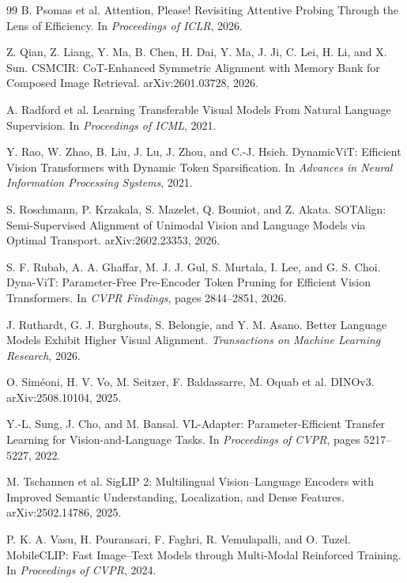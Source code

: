 \documentclass[11pt,a4paper]{article}
\begin{document}
\begin{thebibliography}{99}
B. Psomas et al.
\newblock Attention, Please! Revisiting Attentive Probing Through the Lens of
Efficiency.
\newblock In \emph{Proceedings of ICLR}, 2026.

Z. Qian, Z. Liang, Y. Ma, B. Chen, H. Dai, Y. Ma, J. Ji, C. Lei, H. Li, and
X. Sun.
\newblock CSMCIR: CoT-Enhanced Symmetric Alignment with Memory Bank for
Composed Image Retrieval.
\newblock arXiv:2601.03728, 2026.

A. Radford et al.
\newblock Learning Transferable Visual Models From Natural Language Supervision.
\newblock In \emph{Proceedings of ICML}, 2021.

Y. Rao, W. Zhao, B. Liu, J. Lu, J. Zhou, and C.-J. Hsieh.
\newblock DynamicViT: Efficient Vision Transformers with Dynamic Token
Sparsification.
\newblock In \emph{Advances in Neural Information Processing Systems}, 2021.

S. Roschmann, P. Krzakala, S. Mazelet, Q. Bouniot, and Z. Akata.
\newblock SOTAlign: Semi-Supervised Alignment of Unimodal Vision and Language
Models via Optimal Transport.
\newblock arXiv:2602.23353, 2026.

S. F. Rubab, A. A. Ghaffar, M. J. J. Gul, S. Murtala, I. Lee, and G. S. Choi.
\newblock Dyna-ViT: Parameter-Free Pre-Encoder Token Pruning for Efficient
Vision Transformers.
\newblock In \emph{CVPR Findings}, pages 2844--2851, 2026.

J. Ruthardt, G. J. Burghouts, S. Belongie, and Y. M. Asano.
\newblock Better Language Models Exhibit Higher Visual Alignment.
\newblock \emph{Transactions on Machine Learning Research}, 2026.

O. Sim\'eoni, H. V. Vo, M. Seitzer, F. Baldassarre, M. Oquab et al.
\newblock DINOv3.
\newblock arXiv:2508.10104, 2025.

Y.-L. Sung, J. Cho, and M. Bansal.
\newblock VL-Adapter: Parameter-Efficient Transfer Learning for
Vision-and-Language Tasks.
\newblock In \emph{Proceedings of CVPR}, pages 5217--5227, 2022.

M. Tschannen et al.
\newblock SigLIP 2: Multilingual Vision--Language Encoders with Improved
Semantic Understanding, Localization, and Dense Features.
\newblock arXiv:2502.14786, 2025.

P. K. A. Vasu, H. Pouransari, F. Faghri, R. Vemulapalli, and O. Tuzel.
\newblock MobileCLIP: Fast Image--Text Models through Multi-Modal Reinforced
Training.
\newblock In \emph{Proceedings of CVPR}, 2024.


\end{thebibliography}
\end{document}
